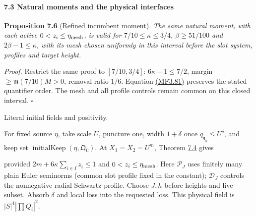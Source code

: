 \hypertarget{the-two-incumbent-ranges-and-the-physical-interfaces}{}

\label{the-two-incumbent-ranges-and-the-physical-interfaces}

\hypertarget{the-two-incumbent-ranges-and-the-physical-interfaces-heading-2}{%
\paragraph{7.3 Natural moments and the physical interfaces}}

\textbf{Proposition 7.6} (Refined incumbent moment). \emph{\hypertarget{mf:plain-refined}{}\label{mf:plain-refined} The same natural moment, with each active \(0<z_i\le\eta_{\rm mesh}\), is valid for \(7/10\le\kappa\le3/4\), \(\beta\ge51/100\) and \(2\beta-1\le\kappa\), with its mesh chosen uniformly in this interval before the slot system, profiles and target height.}

\emph{Proof.} Restrict the same proof to \([7/10,3/4]\): \(6\kappa-1\le7/2\), margin \(\ge\mathfrak m(7/10)M>0\), removal ratio \(1/6\). Equation \protect\hyperlink{mf:eq:B3.81}{(MF3.81)} preserves the stated quantifier order. The mesh and all profile controls remain common on this closed interval. \(\square\)

\hypertarget{literal-initial-fields-and-positivity.}{}

\label{literal-initial-fields-and-positivity.}

Literal initial fields and positivity.

For fixed source \(\eta\), take scale \(U\), puncture one, width \(1+\delta\) once \(q_{\mathfrak q_\eta}\le U^\delta\), and keep set \(\operatorname{initialKeep}(\eta,\mathfrak Q_0)\). At \(X_1=X_2=U^m\), Theorem \protect\hyperlink{mf:plain}{7.4} gives

\par\noindent{}\par

provided \(2m+6\kappa\sum_{i\in I}z_i\le1\) and \(0<z_i\le\eta_{\rm mesh}\). Here \(\mathcal P_J\) uses finitely many plain Euler seminorms (common slot profile fixed in the constant); \(\mathcal D_J\) controls the nonnegative radial Schwartz profile. Choose \(J,h\) before heights and live subset. Absorb \(\delta\) and local loss into the requested loss. This physical field is \(|S|^4|\prod Q_i|^2\).

